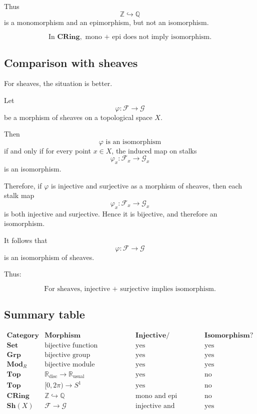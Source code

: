 \documentclass[12pt,a4paper]{article}
\theoremstyle{notespace}
\begin{document}
Thus
\[
\mathbb Z\hookrightarrow \mathbb Q
\]
is a monomorphism and an epimorphism, but not an isomorphism.

\[
\boxed{
	\text{In } \mathbf{CRing},\text{ mono + epi does not imply isomorphism.}
}
\]

\subsection{Comparison with sheaves}

For sheaves, the situation is better.

Let
\[
\varphi:\mathcal F\to \mathcal G
\]
be a morphism of sheaves on a topological space \(X\).

Then
\[
\varphi
\text{ is an isomorphism}
\]
if and only if for every point \(x\in X\), the induced map on stalks
\[
\varphi_x:\mathcal F_x\to \mathcal G_x
\]
is an isomorphism.

Therefore, if \(\varphi\) is injective and surjective as a morphism of sheaves, then each stalk map
\[
\varphi_x:\mathcal F_x\to \mathcal G_x
\]
is both injective and surjective. Hence it is bijective, and therefore an isomorphism.

It follows that
\[
\varphi:\mathcal F\to \mathcal G
\]
is an isomorphism of sheaves.

Thus:

\[
\boxed{
	\text{For sheaves, injective + surjective implies isomorphism.}
}
\]

\subsection{Summary table}

\[
\begin{array}{c|c|c|c}
	\textbf{Category}
	&
	\textbf{Morphism}
	&
	\textbf{Injective/Surjective?}
	&
	\textbf{Isomorphism?}
	\\
	\hline
	\mathbf{Set}
	&
	\text{bijective function}
	&
	\text{yes}
	&
	\text{yes}
	\\[4pt]
	\mathbf{Grp}
	&
	\text{bijective group homomorphism}
	&
	\text{yes}
	&
	\text{yes}
	\\[4pt]
	\mathbf{Mod}_R
	&
	\text{bijective module homomorphism}
	&
	\text{yes}
	&
	\text{yes}
	\\[4pt]
	\mathbf{Top}
	&
	\mathbb R_{\mathrm{disc}}\to \mathbb R_{\mathrm{usual}}
	&
	\text{yes}
	&
	\text{no}
	\\[4pt]
	\mathbf{Top}
	&
	[0,2\pi)\to S^1
	&
	\text{yes}
	&
	\text{no}
	\\[4pt]
	\mathbf{CRing}
	&
	\mathbb Z\hookrightarrow \mathbb Q
	&
	\text{mono and epi}
	&
	\text{no}
	\\[4pt]
	\mathbf{Sh}(X)
	&
	\mathcal F\to \mathcal G
	&
	\text{injective and surjective}
	&
	\text{yes}
\end{array}
\]
\end{document}
